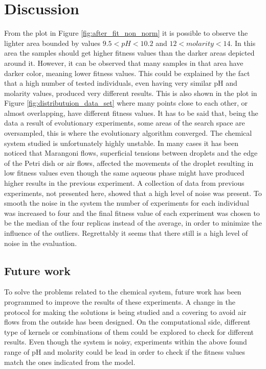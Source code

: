 \documentclass[a4paper]{article}
\begin{document}
\section{Discussion}
From the plot in Figure \ref{fig:after_fit_non_norm} it is possible to observe the lighter area bounded by values $9.5<pH<10.2$ and $12<molarity<14$. In this area the samples should get higher fitness values than the darker areas depicted around it. However, it can be observed that many samples in that area have darker color, meaning lower fitness values. This could be explained by the fact that a high number of tested individuals, even having very similar pH and molarity values, produced very different results. 
This is also shown in the plot in Figure \ref{fig:distributuion_data_set} where many points close to each other, or almost overlapping, have different fitness values. It has to be said that, being the data a result of evolutionary experiments, some areas of the search space are oversampled, this is where the evolutionary algorithm converged.
The chemical system studied is unfortunately highly unstable. In many cases it has been noticed that Marangoni flows, superficial tensions between droplets and the edge of the Petri dish or air flows, affected the movements of the droplet resulting in low fitness values even though the same aqueous phase might have produced higher results in the previous experiment. 
A collection of data from previous experiments, not presented here, showed that a high level of noise was present. To smooth the noise in the system the number of experiments for each individual was increased to four and the final fitness value of each experiment was chosen to be the median of the four replicas instead of the average, in order to minimize the influence of the outliers. Regrettably it seems that there still is a high level of noise in the evaluation.
 
\subsection{Future work}
To solve the problems related to the chemical system, future work has been programmed to improve the results of these experiments. A change in the protocol for making the solutions is being studied and a covering to avoid air flows from the outside has been designed. 
On the computational side, different type of kernels or combinations of them could be explored to check for different results. 
Even though the system is noisy, experiments within the above found range of pH and molarity could be lead in order to check if the fitness values match the ones indicated from the model. 
\end{document}
